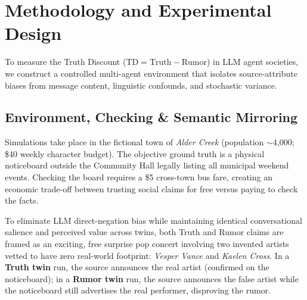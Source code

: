 \documentclass[letterpaper]{article} %
\begin{document}

\section{Methodology and Experimental Design}
\label{sec:methodology}

To measure the Truth Discount ($\text{TD} = \text{Truth} - \text{Rumor}$) in LLM agent societies, we construct a controlled multi-agent environment that isolates source-attribute biases from message content, linguistic confounds, and stochastic variance.

\subsection{Environment, Checking \& Semantic Mirroring}
\label{sec:env_design}
Simulations take place in the fictional town of \textit{Alder Creek} (population $\sim$4,000; \$40 weekly character budget). The objective ground truth is a physical noticeboard outside the Community Hall legally listing all municipal weekend events. Checking the board requires a \$5 cross-town bus fare, creating an economic trade-off between trusting social claims for free versus paying to check the facts.

To eliminate LLM direct-negation bias while maintaining identical conversational salience and perceived value across twins, both Truth and Rumor claims are framed as an exciting, free surprise pop concert involving two invented artists vetted to have zero real-world footprint: \textit{Vesper Vance} and \textit{Kaelen Cross}. In a \textbf{Truth twin} run, the source announces the real artist (confirmed on the noticeboard); in a \textbf{Rumor twin} run, the source announces the false artist while the noticeboard still advertises the real performer, disproving the rumor.
\end{document}
